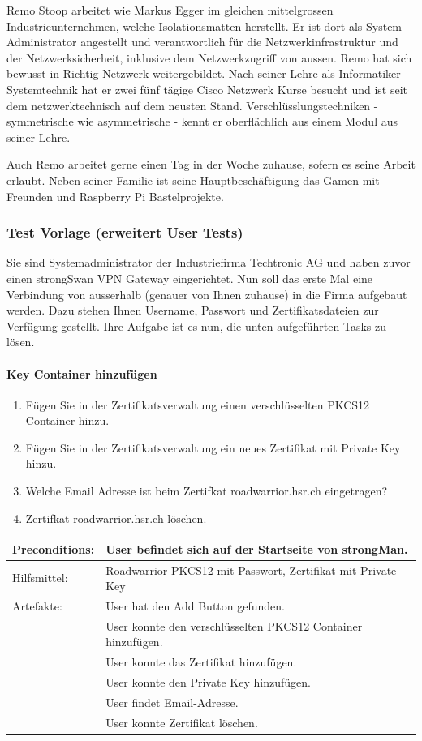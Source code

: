 Remo Stoop arbeitet wie Markus Egger im gleichen mittelgrossen Industrieunternehmen, welche Isolationsmatten herstellt. Er ist dort als System Administrator angestellt und verantwortlich für die Netzwerkinfrastruktur und der Netzwerksicherheit, inklusive dem Netzwerkzugriff von aussen.  Remo hat sich bewusst in Richtig Netzwerk weitergebildet. Nach seiner Lehre als Informatiker Systemtechnik hat er zwei fünf tägige Cisco Netzwerk Kurse besucht und ist seit dem netzwerktechnisch auf dem neusten Stand. Verschlüsslungstechniken - symmetrische wie asymmetrische - kennt er oberflächlich aus einem Modul aus seiner Lehre.

Auch Remo arbeitet gerne einen Tag in der Woche zuhause, sofern es seine Arbeit erlaubt. Neben seiner Familie ist seine Hauptbeschäftigung das Gamen mit Freunden und Raspberry Pi Bastelprojekte.


\subsubsection{Test Vorlage (erweitert User Tests)}

Sie sind Systemadministrator der Industriefirma Techtronic AG und haben zuvor einen strongSwan VPN Gateway eingerichtet. Nun soll das erste Mal eine Verbindung von ausserhalb (genauer von Ihnen zuhause) in die Firma aufgebaut werden. Dazu stehen Ihnen Username, Passwort und Zertifikatsdateien zur Verfügung gestellt. Ihre Aufgabe ist es nun, die unten aufgeführten Tasks zu lösen.

\paragraph{Key Container hinzufügen}
\begin{enumerate}
    \item Fügen Sie in der Zertifikatsverwaltung einen verschlüsselten PKCS12 Container hinzu.
    \item Fügen Sie in der Zertifikatsverwaltung ein neues Zertifikat mit Private Key hinzu.
    \item Welche Email Adresse ist beim Zertifkat roadwarrior.hsr.ch eingetragen?
    \item Zertifkat roadwarrior.hsr.ch löschen.
\end{enumerate}


\begin{tabular}{ | p{} | p{} | }
\hline
Preconditions: & User befindet sich auf der Startseite von strongMan. \\
\hline
Hilfsmittel: & Roadwarrior PKCS12 mit Passwort, Zertifikat mit Private Key \\
\hline
Artefakte: & User hat den Add Button gefunden. \\
& User konnte den verschlüsselten PKCS12 Container hinzufügen. \\
& User konnte das Zertifikat hinzufügen. \\
& User konnte den Private Key hinzufügen. \\
& User findet Email-Adresse. \\
& User konnte Zertifikat löschen. \\
\hline
\end{tabular}


